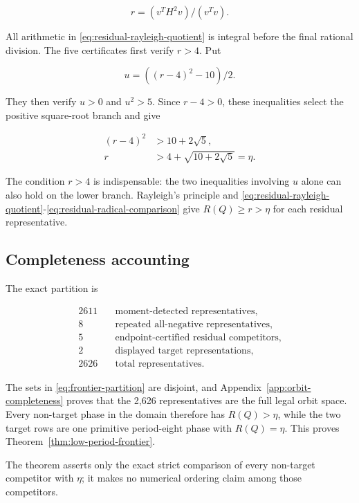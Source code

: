 \begin{equation}
\label{eq:residual-rayleigh-quotient}
r=(v^T H^{2} v)/(v^T v).
\end{equation}

All arithmetic in \eqref{eq:residual-rayleigh-quotient} is integral before the final rational division. The
five certificates first verify \(r>4\). Put

\begin{equation}
u=((r-4)^{2}-10)/2.
\end{equation}

They then verify \(u>0\) and \(u^{2}>5\). Since \(r-4>0\), these inequalities select
the positive square-root branch and give

\begin{equation}
\label{eq:residual-radical-comparison}
\begin{aligned}
(r-4)^{2}&>10+2\sqrt{5}, \\
r&>4+\sqrt{10+2\sqrt{5}}=\eta.
\end{aligned}
\end{equation}

The condition \(r>4\) is indispensable: the two inequalities involving \(u\)
alone can also hold on the lower branch. Rayleigh's principle and \eqref{eq:residual-rayleigh-quotient}-\eqref{eq:residual-radical-comparison}
give \(R(Q)\geq r>\eta\) for each residual representative.

\subsection{Completeness accounting}

The exact partition is

\begin{equation}
\label{eq:frontier-partition}
\begin{aligned}2611&\quad\text{moment-detected representatives},\\
8&\quad\text{repeated all-negative representatives},\\
5&\quad\text{endpoint-certified residual competitors},\\
2&\quad\text{displayed target representations},\\
2626&\quad\text{total representatives}.
\end{aligned}
\end{equation}

The sets in \eqref{eq:frontier-partition} are disjoint, and Appendix~\ref{app:orbit-completeness} proves that the 2,626
representatives are the full legal orbit space. Every non-target phase in the
domain therefore has \(R(Q)>\eta\), while the two target rows are one primitive
period-eight phase with \(R(Q)=\eta\). This proves Theorem~\ref{thm:low-period-frontier}.

The theorem asserts only the exact strict comparison of every non-target
competitor with \(\eta\); it makes no numerical ordering claim among those
competitors.
